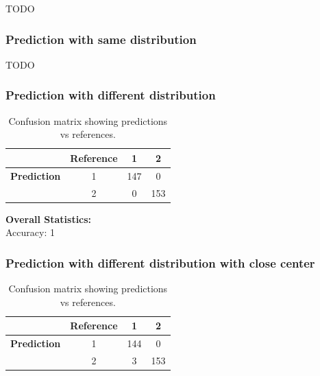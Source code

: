 \documentclass{article}
\begin{document}
TODO

\subsubsection*{Prediction with same distribution}

TODO

\subsubsection*{Prediction with different distribution}

\begin{table}[h]
  \centering
  \begin{tabular}{c|c|c|c}
            & \textbf{Reference} & 1 & 2 \\
  \hline
  \textbf{Prediction} & 1 & 147 & 0 \\
                      & 2 & 0 & 153 \\
  \end{tabular}
  \caption{Confusion matrix showing predictions vs references.}
  \label{tab:confusion_matrix}
  \end{table}
  
  \vspace{0.5cm} %
  
  \noindent\textbf{Overall Statistics:} \\
  Accuracy: 1

\subsubsection*{Prediction with different distribution with close center}

  \begin{table}[h]
    \centering
    \begin{tabular}{c|c|c|c}
              & \textbf{Reference} & 1 & 2 \\
    \hline
    \textbf{Prediction} & 1 & 144 & 0 \\
                        & 2 & 3 & 153 \\
    \end{tabular}
    \caption{Confusion matrix showing predictions vs references.}
    \label{tab:confusion_matrix}
    \end{table}
    
    \vspace{0.5cm} %
    
\end{document}
